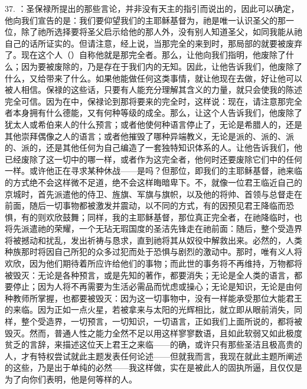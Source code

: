 37. ：圣保禄所提出的那些言论，并非没有天主的指引而说出的，因此可以确定，他向我们宣告的是：我们要仰望我们的主耶稣基督为，祂是唯一认识圣父的那一位，除了祂所选择要将圣父启示给他的那人外，没有别人知道圣父，如同我能从祂自己的话所证实的。但请注意，经上说，当那完全的来到时，那局部的就要被废弃了。现在这个人（）自称他就是那完全者。那么，让他向我们指明，他废除了什么；因为要被废除的，乃是存在于我们内的无知。因此，让他告诉我们，他废除了什么，又给带来了什么。如果他能做任何这类事情，就让他现在去做，好让他可以被人相信。保禄的这些话，只要有人能充分理解其含义的力量，就只会使我的陈述完全可信。因为在中，保禄论到那将要来的完全时，这样说：现在，请注意那完全者本身拥有什么德能，又有何种等级的成全。那么，让这个人告诉我们，他废除了犹太人或希伯来人的什么预言；或者他使何种语言停止了，无论是希腊人的，还是其他崇拜偶像之人的语言；或者他摧毁了哪种异端教义，无论是派的、派的、派的、派的，还是其他任何为自己编造了一套独特知识体系的人。让他告诉我们，他已经废除了这一切中的哪一样，或者作为这完全者，他何时还要废除它们中的任何一样。或许他正在寻求某种休战——是吗？但那位，即我们的主耶稣基督，祂来临的方式绝不会这样微不足道，绝不会这样晦暗卑下。不，就像一位君王临近自己的京城时，首先派遣他的侍卫、旌旗、军旗与旗帜，以及他的将帅、首领与总督走在前面，随后一切事物都被激发并震动，以不同的方式，有的因预见君王降临而恐惧，有的则欢欣鼓舞；同样，我的主耶稣基督，那位真正完全者，在祂降临时，也将先派遣祂的荣耀，一个无玷无瑕国度的圣洁先锋走在祂前面：随后，整个受造界将被撼动和扰乱，发出祈祷与恳求，直到祂将其从奴役中解救出来。必然的，人类种族那时将因自己所犯的众多过犯而处于恐惧与剧烈的激动中。那时，唯有义人将欢欣，因为他们期待着所应许给他们的事物；而此世的事务将不再维持，万物都将被毁灭：无论是各种预言，或是先知的著作，都要消失；无论是全人类的语言，都要停止；因为人将不再需要为生活必需品而忧虑或操心；无论是知识，无论是由何种教师所掌握，也都要被毁灭：因为这一切事物中，没有一样能承受那位大能君王的来临。因为正如一点火星，若被拿来与太阳的光辉相比，就立即从眼前消失，同样，整个受造界，一切预言，一切知识，一切语言，正如我们上面所说的，都将被毁灭。然而，普通人性之能力全然不足以用这样寥寥数语，且如此软弱又如此极度贫乏的言辞，来描述这位天上君王之来临——的确，或许只有那些圣洁且极高贵的人，才有特权尝试就此主题发表任何论述——但就我而言，我现在就此主题所阐述的这些，乃是出于单纯的必然——我这样做，实在是被此人的固执所逼，且仅仅是为了向你们表明，他是何等样的人。\par

